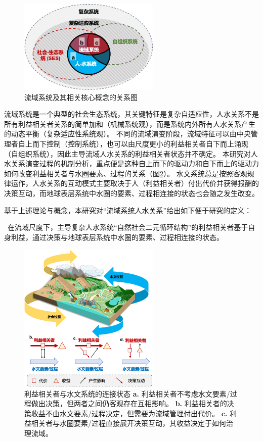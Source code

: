\begin{figure}[!ht] %
    \centering
    \includegraphics[width=0.6\textwidth]{img/ch2/ch2_concepts.png}
    \caption{流域系统及其相关核心概念的关系图}\label{ch2:fig:concepts}
\end{figure}

流域系统是一个典型的社会\textendash{}生态系统，其关键特征是复杂自适应性，人\textendash{}水关系不是所有利益相关者关系的简单加和（机械系统观），而是系统内外所有人\textendash{}水关系产生的动态平衡（复杂适应性系统观）。
不同的流域演变阶段，流域特征可以由中央管理者自上而下控制（控制系统），也可以由尺度更小的利益相关者自下而上涌现（自组织系统），因此主导流域人\textendash{}水关系的利益相关者状态并不确定。
本研究对人\textendash{}水关系演变过程的机制分析，重点便是这种自上而下的驱动力和自下而上的驱动力如何改变利益相关者与水圈要素、过程的关系（图\ref{ch2:fig:interactions}）。
水文系统总是按照客观规律运作，人\textendash{}水关系的互动模式主要取决于人（利益相关者）付出代价并获得报酬的决策互动，而地球表层系统中水圈的要素、过程相连接的状态也会随之发生改变。

基于上述理论与概念，本研究对“流域系统人\textendash{}水关系”给出如下便于研究的定义：

{\kai~在流域尺度下，主导复杂人水系统“自然\textendash{}社会二元循环结构”的利益相关者基于自身利益，通过决策与地球表层系统中水圈的要素、过程相连接的状态。}

\begin{figure}[!ht]
    \centering
    \includegraphics[width=0.6\textwidth]{img/ch2/ch2_interactions.png}
    \caption[利益相关者与水文系统的连接状态]{利益相关者与水文系统的连接状态
        \textbf{a.} 利益相关者不考虑水文要素/过程做出决策，但两者之间仍客观存在互相影响。
        \textbf{b.} 利益相关者的决策收益不由水文要素/过程决定，但需要为流域管理付出代价。
        \textbf{c.} 利益相关者与水圈要素/过程直接展开决策互动，其收益决定于如何治理流域。
    }\label{ch2:fig:interactions}
\end{figure}
